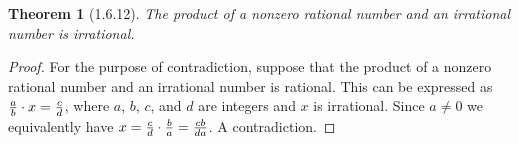\documentclass[a4paper, 12pt]{article}
\theoremstyle{plain}
\newtheorem*{theorem*}{Theorem}
\begin{document}
	
	\begin{theorem*}[1.6.12]
		The product of a nonzero rational number and an irrational number is irrational.
	\end{theorem*}
	
	\begin{proof}
		For the purpose of contradiction, suppose that the product of a nonzero rational number and an 
		irrational number is rational. This can be expressed as 
		$\frac{a}{b} \space \cdot \space x = \frac{c}{d}$, where $a$, $b$, $c$, and $d$ are integers and $x$ 
		is irrational. Since $a \neq 0$ we equivalently have 
		$x = \frac{c}{d} \space \cdot \space \frac{b}{a} = \frac{cb}{da}$. A contradiction.
	\end{proof}
\end{document}
